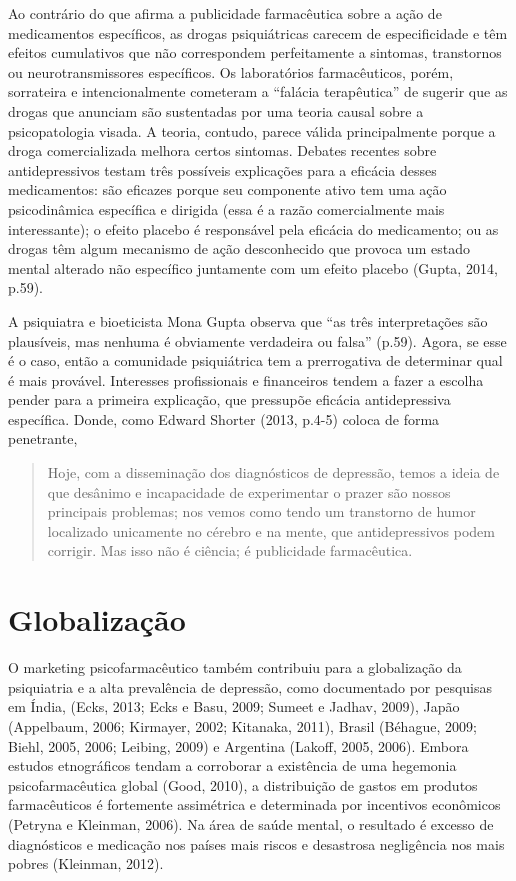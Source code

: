 Ao contrário do que afirma a publicidade farmacêutica sobre a ação de
medicamentos específicos, as drogas psiquiátricas carecem de
especificidade e têm efeitos cumulativos que não correspondem
perfeitamente a sintomas, transtornos ou neurotransmissores específicos.
Os laboratórios farmacêuticos, porém, sorrateira e intencionalmente
cometeram a ``falácia terapêutica'' de sugerir que as drogas que
anunciam são sustentadas por uma teoria causal sobre a psicopatologia
visada. A teoria, contudo, parece válida principalmente porque a droga
comercializada melhora certos sintomas. Debates recentes sobre
antidepressivos testam três possíveis explicações para a eficácia desses
medicamentos: são eficazes porque seu componente ativo tem uma ação
psicodinâmica específica e dirigida (essa é a razão comercialmente mais
interessante); o efeito placebo é responsável pela eficácia do
medicamento; ou as drogas têm algum mecanismo de ação desconhecido que
provoca um estado mental alterado não específico juntamente com um
efeito placebo (Gupta, 2014, p.59).

A psiquiatra e bioeticista Mona Gupta observa que ``as três
interpretações são plausíveis, mas nenhuma é obviamente verdadeira ou
falsa'' (p.59). Agora, se esse é o caso, então a comunidade psiquiátrica
tem a prerrogativa de determinar qual é mais provável. Interesses
profissionais e financeiros tendem a fazer a escolha pender para a
primeira explicação, que pressupõe eficácia antidepressiva específica.
Donde, como Edward Shorter (2013, p.4-5) coloca de forma penetrante,

\begin{quote}
Hoje, com a disseminação dos diagnósticos de depressão, temos a ideia de
que desânimo e incapacidade de experimentar o prazer são nossos
principais problemas; nos vemos como tendo um transtorno de humor
localizado unicamente no cérebro e na mente, que antidepressivos podem
corrigir. Mas isso não é ciência; é publicidade farmacêutica.
\end{quote}

\chapter{Globalização}

O marketing psicofarmacêutico também contribuiu para a globalização da
psiquiatria e a alta prevalência de depressão, como documentado por
pesquisas em Índia, (Ecks, 2013; Ecks e Basu, 2009; Sumeet e Jadhav,
2009), Japão (Appelbaum, 2006; Kirmayer, 2002; Kitanaka, 2011), Brasil
(Béhague, 2009; Biehl, 2005, 2006; Leibing, 2009) e Argentina (Lakoff,
2005, 2006). Embora estudos etnográficos tendam a corroborar a
existência de uma hegemonia psicofarmacêutica global (Good, 2010), a
distribuição de gastos em produtos farmacêuticos é fortemente
assimétrica e determinada por incentivos econômicos (Petryna e Kleinman,
2006). Na área de saúde mental, o resultado é excesso de diagnósticos e
medicação nos países mais riscos e desastrosa negligência nos mais
pobres (Kleinman, 2012).

